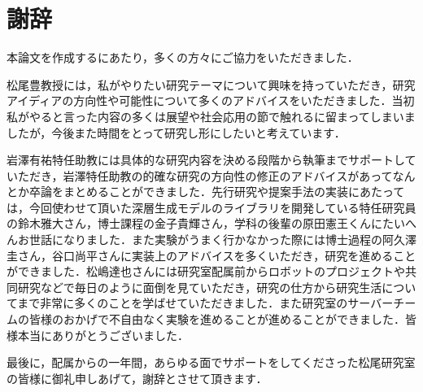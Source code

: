 \chapter*{謝辞}
\label{chap:acknowledgments}
本論文を作成するにあたり，多くの方々にご協力をいただきました．

松尾豊教授には，私がやりたい研究テーマについて興味を持っていただき，研究アイディアの方向性や可能性について多くのアドバイスをいただきました．当初私がやると言った内容の多くは展望や社会応用の節で触れるに留まってしまいましたが，今後また時間をとって研究し形にしたいと考えています．

岩澤有祐特任助教には具体的な研究内容を決める段階から執筆までサポートしていただき，岩澤特任助教の的確な研究の方向性の修正のアドバイスがあってなんとか卒論をまとめることができました．先行研究や提案手法の実装にあたっては，今回使わせて頂いた深層生成モデルのライブラリを開発している特任研究員の鈴木雅大さん，博士課程の金子貴輝さん，学科の後輩の原田憲王くんにたいへんお世話になりました．また実験がうまく行かなかった際には博士過程の阿久澤圭さん，谷口尚平さんに実装上のアドバイスを多くいただき，研究を進めることができました．松嶋達也さんには研究室配属前からロボットのプロジェクトや共同研究などで毎日のように面倒を見ていただき，研究の仕方から研究生活についてまで非常に多くのことを学ばせていただきました．また研究室のサーバーチームの皆様のおかげで不自由なく実験を進めることが進めることができました．皆様本当にありがとうございました．

最後に，配属からの一年間，あらゆる面でサポートをしてくださった松尾研究室の皆様に御礼申しあげて，謝辞とさせて頂きます．